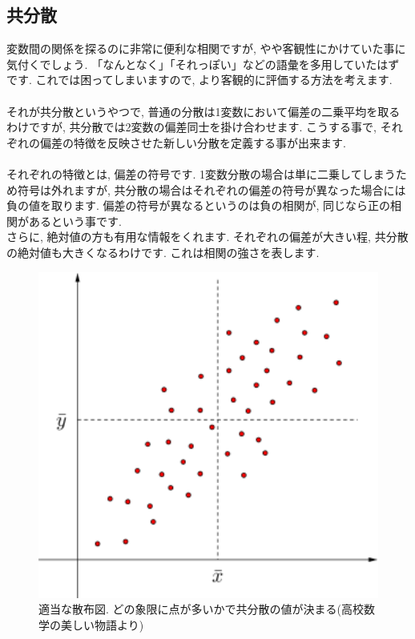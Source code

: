 \documentclass[11pt,a4paper]{jreport}
\begin{document}
\subsection{共分散}
変数間の関係を探るのに非常に便利な相関ですが, やや客観性にかけていた事に気付くでしょう. 「なんとなく」「それっぽい」などの語彙を多用していたはずです. これでは困ってしまいますので, より客観的に評価する方法を考えます.\\
\\
それが共分散というやつで, 普通の分散は1変数において偏差の二乗平均を取るわけですが, 共分散では2変数の偏差同士を掛け合わせます. こうする事で, それぞれの偏差の特徴を反映させた新しい分散を定義する事が出来ます. \\
\\
それぞれの特徴とは, 偏差の符号です. 1変数分散の場合は単に二乗してしまうため符号は外れますが, 共分散の場合はそれぞれの偏差の符号が異なった場合には負の値を取ります. 偏差の符号が異なるというのは負の相関が, 同じなら正の相関があるという事です.\\
さらに, 絶対値の方も有用な情報をくれます. それぞれの偏差が大きい程, 共分散の絶対値も大きくなるわけです. これは相関の強さを表します.\\

\begin{figure}[H]
\label{im:co-var}
  \centering
  \includegraphics[width=120mm,bb=0 0 432 288]{../figures/kyoubunnsann.png}
  \caption{適当な散布図. どの象限に点が多いかで共分散の値が決まる(高校数学の美しい物語より)}
\end{figure}
\end{document}
